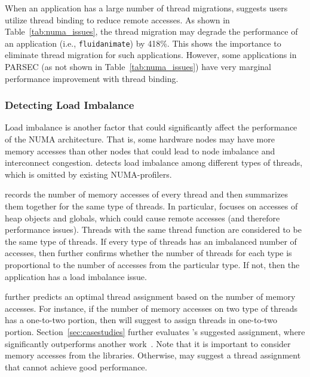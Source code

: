 When an application has a large number of thread migrations,  \NP{} suggests users utilize thread binding to reduce remote accesses. As shown in Table~\ref{tab:numa_issues}, the thread migration may degrade the performance of an application (i.e., \texttt{fluidanimate}) by 418\%. This shows the importance to eliminate thread migration for such applications.  However, some applications in PARSEC (as not shown in Table~\ref{tab:numa_issues}) have very marginal performance improvement with thread binding. 

\subsubsection{Detecting Load Imbalance}
\label{sec:loadimbalance}

Load imbalance is another factor that could significantly affect the performance of the NUMA architecture. That is,  some hardware nodes may have more memory accesses than other nodes that  could lead to node imbalance and interconnect congestion. \NP{} detects load imbalance among different types of threads, which is omitted by existing NUMA-profilers.  


\NP{} records the number of memory accesses of every thread and then summarizes them together for the same type of threads. In particular, \NP{} focuses on accesses of heap objects and globals, which could cause remote accesses (and therefore performance issues). Threads with the same thread function are considered to be the same type of threads. If every type of threads has an imbalanced number of accesses, then \NP{} further confirms whether the number of threads for each type is proportional to the number of accesses from the particular type. If not, then the application has a load imbalance issue. 


\NP{} further predicts an optimal thread assignment based on the number of memory accesses. 
For instance, if the number of memory accesses on two type of threads has a one-to-two portion, then \NP{} will suggest to assign threads in one-to-two portion. Section~\ref{sec:casestudies} further evaluates \NP{}'s suggested assignment, where \NP{} significantly outperforms another work~\cite{SyncPerf}. Note that it is important to consider memory accesses from the libraries. Otherwise, \NP{} may suggest a thread assignment that cannot achieve good performance. 



